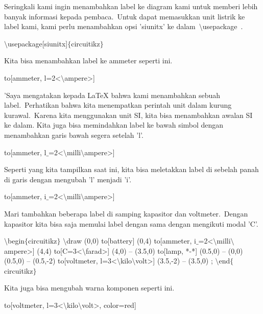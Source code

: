 \noindent 
Seringkali kami ingin menambahkan label ke diagram kami untuk memberi lebih banyak informasi kepada pembaca. Untuk dapat memasukkan unit listrik ke label kami, kami perlu menambahkan opsi 'siunitx' ke dalam $\setminus$usepackage .
\par


\noindent 
 $\setminus$usepackage[siunitx]$ \{ $circuitikz$ \} $ 
\par


\noindent 
Kita bisa menambahkan label ke ammeter seperti ini.
\par


\noindent 
 to[ammeter, l=2<$\setminus$ampere>] 
\par


\noindent 
'Saya mengatakan kepada LaTeX bahwa kami menambahkan sebuah label. Perhatikan bahwa kita menempatkan perintah unit dalam kurung kurawal. Karena kita menggunakan unit SI, kita bisa menambahkan awalan SI ke dalam. Kita juga bisa memindahkan label ke bawah simbol dengan menambahkan garis bawah segera setelah 'l'.
\par


\noindent 
 to[ammeter, l$ \_ $=2<$\setminus$milli$\setminus$ampere>] 
\par


\noindent 
Seperti yang kita tampilkan saat ini, kita bisa meletakkan label di sebelah panah di garis dengan mengubah 'l' menjadi 'i'.
\par


\noindent 
 to[ammeter, i$ \_ $=2<$\setminus$milli$\setminus$ampere>] 
\par


\noindent 
Mari tambahkan beberapa label di samping kapasitor dan voltmeter. Dengan kapasitor kita bisa saja memulai label dengan sama dengan mengikuti modal 'C'.
\par


\noindent 
 $\setminus$begin$ \{ $circuitikz$ \} $ $\setminus$draw (0,0) to[battery] (0,4) to[ammeter, i$ \_ $=2<$\setminus$milli$\setminus$ampere>] (4,4) to[C=3<$\setminus$farad>] (4,0) -- (3.5,0) to[lamp, *-*] (0.5,0) -- (0,0) (0.5,0) -- (0.5,-2) to[voltmeter, l=3<$\setminus$kilo$\setminus$volt>] (3.5,-2) -- (3.5,0) ; $\setminus$end$ \{ $circuitikz$ \} $ 
\par


\noindent 
Kita juga bisa mengubah warna komponen seperti ini.
\par


\noindent 
 to[voltmeter, l=3<$\setminus$kilo$\setminus$volt>, color=red] 
\par


